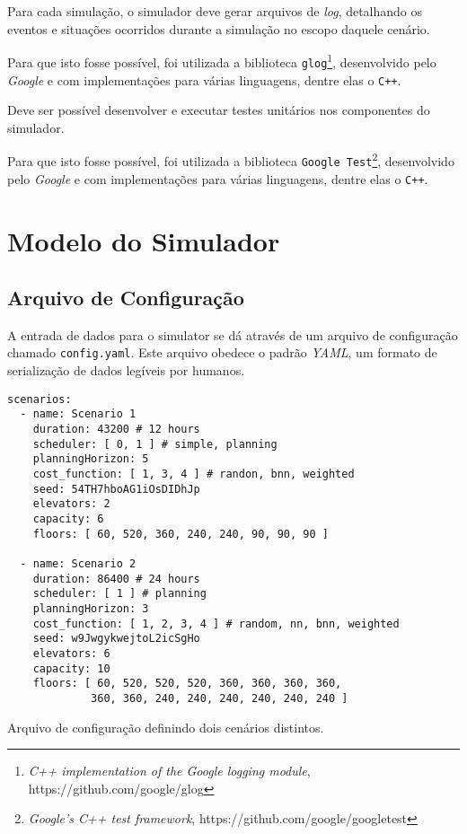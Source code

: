 \begin{description}[leftmargin=!,labelwidth=\widthof{\bfseries Determinístico}]
  \item[Rastreável]

  Para cada simulação, o simulador deve gerar arquivos de \textit{log},
  detalhando os eventos e situações ocorridos durante a simulação no escopo
  daquele cenário.

  Para que isto fosse possível, foi utilizada a biblioteca
  \texttt{glog}\footnote{\textit{C++ implementation of the Google logging
  module}, https://github.com/google/glog}, desenvolvido pelo \textit{Google} e
  com implementações para várias linguagens, dentre elas o \texttt{C++}.

  \item[Testável]

  Deve ser possível desenvolver e executar testes unitários nos componentes do
  simulador.

  Para que isto fosse possível, foi utilizada a biblioteca \texttt{Google
  Test}\footnote{\textit{Google's C++ test framework},
  https://github.com/google/googletest}, desenvolvido pelo \textit{Google} e
  com implementações para várias linguagens, dentre elas o \texttt{C++}.

\end{description}

\section{\label{simulator:model}Modelo do Simulador}

\subsection{\label{simulator:model:config}Arquivo de Configuração}

A entrada de dados para o simulator se dá através de um arquivo de configuração
chamado \texttt{config.yaml}. Este arquivo obedece o padrão \textit{YAML}, um
formato de serialização de dados legíveis por humanos.

\begin{algorithm}[htb]
  \centering
    \begin{verbatim}
scenarios:
  - name: Scenario 1
    duration: 43200 # 12 hours
    scheduler: [ 0, 1 ] # simple, planning
    planningHorizon: 5
    cost_function: [ 1, 3, 4 ] # randon, bnn, weighted
    seed: 54TH7hboAG1iOsDIDhJp
    elevators: 2
    capacity: 6
    floors: [ 60, 520, 360, 240, 240, 90, 90, 90 ]

  - name: Scenario 2
    duration: 86400 # 24 hours
    scheduler: [ 1 ] # planning
    planningHorizon: 3
    cost_function: [ 1, 2, 3, 4 ] # random, nn, bnn, weighted
    seed: w9JwgykwejtoL2icSgHo
    elevators: 6
    capacity: 10
    floors: [ 60, 520, 520, 520, 360, 360, 360, 360,
             360, 360, 240, 240, 240, 240, 240, 240 ]
    \end{verbatim}
  \caption{Arquivo de configuração definindo dois cenários distintos.}
  \label{alg:config}
\end{algorithm}

